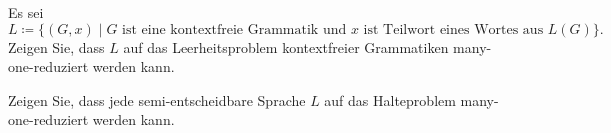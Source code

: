 \documentclass[german]{latteachCD}[2017/03/28]
\begin{document}
\begin{exercise}
  Es sei
  \begin{equation*}
    L \coloneqq \{(G,x) \mid G \text{ ist eine kontextfreie Grammatik und $x$ ist
      Teilwort eines Wortes aus } L(G)\}.
  \end{equation*}
  Zeigen Sie, dass $L$ auf das Leerheitsproblem kontextfreier Grammatiken
  many-one-reduziert werden kann.

\end{exercise}

\begin{exercise}
  Zeigen Sie, dass jede semi-entscheidbare Sprache $L$ auf das Halteproblem
  many-one-reduziert werden kann.
\end{exercise}
\end{document}
